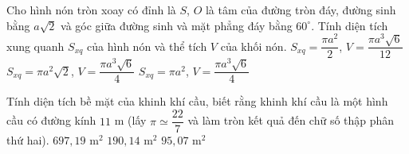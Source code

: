 \begin{ex}%
	Cho hình nón tròn xoay có đỉnh là $S$, $O$ là tâm của đường tròn đáy, đường sinh bằng $a\sqrt{2}$ và góc giữa đường sinh và mặt phẳng đáy bằng $60^\circ$. Tính diện tích xung quanh $S_{xq}$ của hình nón và thể tích $V$ của khối nón.
	{$S_{xq}=\dfrac{\pi a^2}{2}$, $V=\dfrac{\pi a^3\sqrt{6}}{12}$}
	{$S_{xq}=\pi a^2\sqrt{2}$, $V=\dfrac{\pi a^3\sqrt{6}}{4}$}
	{$S_{xq}=\pi a^2$, $V=\dfrac{\pi a^3\sqrt{6}}{4}$}
\end{ex}

\begin{ex}%
	Tính diện tích bề mặt của khinh khí cầu, biết rằng khinh khí cầu là một hình cầu có đường kính $11$ m (lấy $\pi \simeq \dfrac{22}{7}$ và làm tròn kết quả đến chữ số thập phân thứ hai).
	{$697{,}19$ m$^2$}
	{$190{,}14$ m$^2$}
	{$95{,}07$ m$^2$}
\end{ex}

